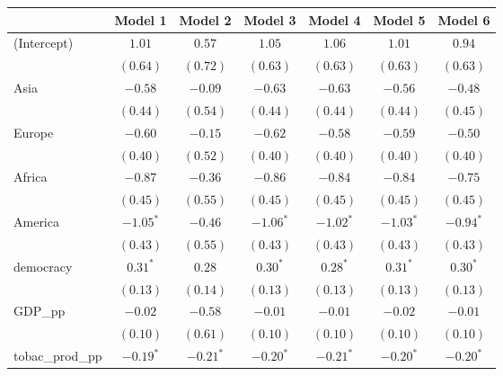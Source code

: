 
\begin{table}[!h]
\begin{center}
\begin{tabular}{l c c c c c c }
\toprule
 & Model 1 & Model 2 & Model 3 & Model 4 & Model 5 & Model 6 \\
\midrule
(Intercept)             & $1.01$       & $0.57$       & $1.05$       & $1.06$       & $1.01$       & $0.94$       \\
                        & $(0.64)$     & $(0.72)$     & $(0.63)$     & $(0.63)$     & $(0.63)$     & $(0.63)$     \\
Asia                    & $-0.58$      & $-0.09$      & $-0.63$      & $-0.63$      & $-0.56$      & $-0.48$      \\
                        & $(0.44)$     & $(0.54)$     & $(0.44)$     & $(0.44)$     & $(0.44)$     & $(0.45)$     \\
Europe                  & $-0.60$      & $-0.15$      & $-0.62$      & $-0.58$      & $-0.59$      & $-0.50$      \\
                        & $(0.40)$     & $(0.52)$     & $(0.40)$     & $(0.40)$     & $(0.40)$     & $(0.40)$     \\
Africa                  & $-0.87$      & $-0.36$      & $-0.86$      & $-0.84$      & $-0.84$      & $-0.75$      \\
                        & $(0.45)$     & $(0.55)$     & $(0.45)$     & $(0.45)$     & $(0.45)$     & $(0.45)$     \\
America                 & $-1.05^{*}$  & $-0.46$      & $-1.06^{*}$  & $-1.02^{*}$  & $-1.03^{*}$  & $-0.94^{*}$  \\
                        & $(0.43)$     & $(0.55)$     & $(0.43)$     & $(0.43)$     & $(0.43)$     & $(0.43)$     \\
democracy               & $0.31^{*}$   & $0.28$       & $0.30^{*}$   & $0.28^{*}$   & $0.31^{*}$   & $0.30^{*}$   \\
                        & $(0.13)$     & $(0.14)$     & $(0.13)$     & $(0.13)$     & $(0.13)$     & $(0.13)$     \\
GDP\_pp                 & $-0.02$      & $-0.58$      & $-0.01$      & $-0.01$      & $-0.02$      & $-0.01$      \\
                        & $(0.10)$     & $(0.61)$     & $(0.10)$     & $(0.10)$     & $(0.10)$     & $(0.10)$     \\
tobac\_prod\_pp         & $-0.19^{*}$  & $-0.21^{*}$  & $-0.20^{*}$  & $-0.21^{*}$  & $-0.20^{*}$  & $-0.20^{*}$  \\

\end{tabular}
\end{center}
\end{table}
